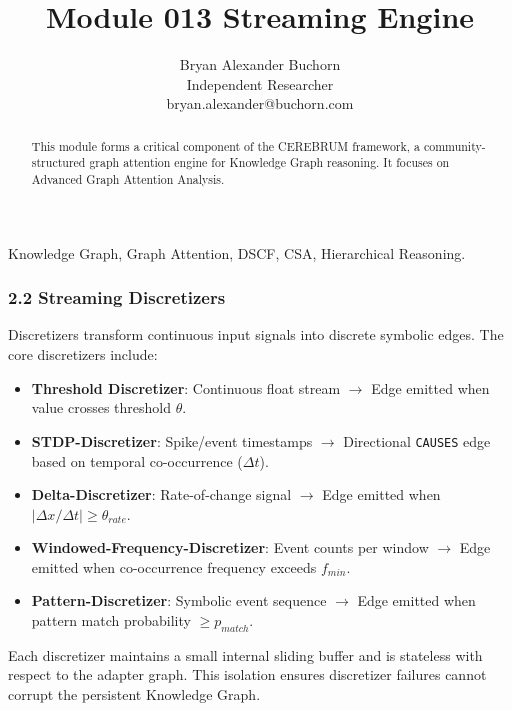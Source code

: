 \documentclass[10pt,journal,compsoc]{IEEEtran}
\begin{document}
\title{Module 013 Streaming Engine}
\author{Bryan Alexander Buchorn \\ Independent Researcher \\ bryan.alexander@buchorn.com}

\maketitle

\begin{abstract}
This module forms a critical component of the CEREBRUM framework, a community-structured graph attention engine for Knowledge Graph reasoning. It focuses on Advanced Graph Attention Analysis.
\end{abstract}

\begin{IEEEkeywords}
Knowledge Graph, Graph Attention, DSCF, CSA, Hierarchical Reasoning.
\end{IEEEkeywords}

\subsubsection{2.2 Streaming Discre\-tizers}
Discre\-tizers transform continuous input signals into discrete symbolic edges. The core discr\-etizers include:

\begin{itemize}
\item \textbf{Threshold Discretizer}: Continuous float stream $\to$ Edge emitted when value crosses threshold $\theta$.
\item \textbf{STDP-Discretizer}: Spike/event timestamps $\to$ Directional \texttt{CAUSES} edge based on temporal co-occurrence ($\Delta t$).
\item \textbf{Delta-Discretizer}: Rate-of-change signal $\to$ Edge emitted when $|\Delta x / \Delta t| \geq \theta_{rate}$.
\item \textbf{Windowed-Frequency-Discretizer}: Event counts per window $\to$ Edge emitted when co-occurrence frequency exceeds $f_{min}$.
\item \textbf{Pattern-Discretizer}: Symbolic event sequence $\to$ Edge emitted when pattern match probability $\geq p_{match}$.

\end{itemize}
Each discretizer maintains a small internal sliding buffer and is stateless with respect to the adapter graph. This isolation ensures discretizer failures cannot corrupt the persistent Knowledge Graph.




\end{document}
